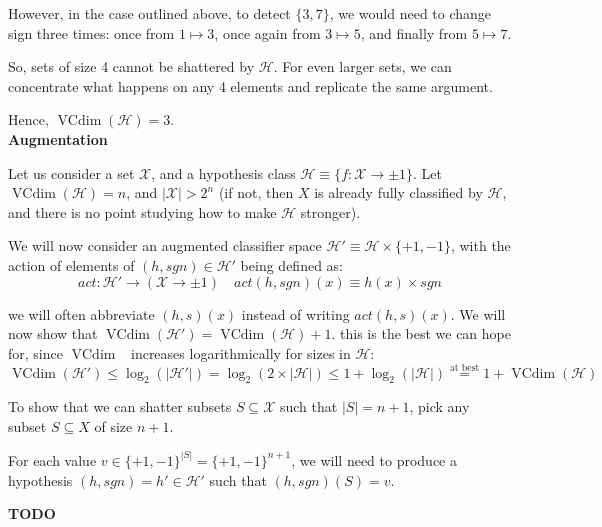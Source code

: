 \documentclass[11pt]{article}
\renewcommand{\H}{\ensuremath{\mathcal{H}}}
\newcommand{\X}{\ensuremath{\mathcal{X}}}
\DeclareMathOperator{\vcdim}{VCdim}
\newcommand{\vc}{\ensuremath{\vcdim}}
\begin{document}
However, in the case outlined above, to detect $\{3, 7\}$,
we would need to change sign three times:
once from $1 \mapsto 3$, once again from $3 \mapsto 5$, and finally from $5 \mapsto 7$.

So, sets of size 4 cannot be shattered by $\H$. For even larger sets, we can concentrate
what happens on any 4 elements and replicate the same argument.

Hence, $\vc(\H) = 3$.
\\
\textbf{Augmentation}

Let us consider a set $\X$, and a hypothesis class $\H \equiv \{ f : \X \rightarrow \pm 1 \}$. Let $\vc(\H) = n$, and
$|\X| > 2^{n}$ (if not, then $X$ is already fully classified by $\H$, and there
is no point studying how to make $\H$ stronger).

We will now consider an augmented classifier space $\H' \equiv \H \times \{+1, -1\}$,
with the action of elements of $(h, sgn) \in \H'$ being defined as:
$$
act: \H' \rightarrow (\X \rightarrow \pm 1) \quad
act(h, sgn)(x) \equiv h(x) \times sgn
$$

we will often abbreviate $(h, s)(x)$ instead of writing $act(h, s)(x)$. We will
now show that $\vc(\H') = \vc(\H) + 1$. this is the best we can hope for,
since \vc~ increases logarithmically for sizes in $\H$:
$$
\vc(\H') \leq \log_2(|\H'|) = \log_2(2 \times |\H|) \leq 1 + \log_2(|\H|) \overset{\text{at best}}{=} 1 + \vc(\H)
$$

To show that we can shatter subsets $S \subseteq \X$ such that $|S| = n + 1$, 
pick any subset $S \subseteq X$ of size $n + 1$.

For each value $v \in \{+1, -1\}^{|S|} = \{+1, -1\}^{n + 1}$, we will need
to produce a hypothesis $(h, sgn) = h' \in \H'$ such that $(h, sgn)(S) = v$.

\textbf{TODO}
\end{document}
